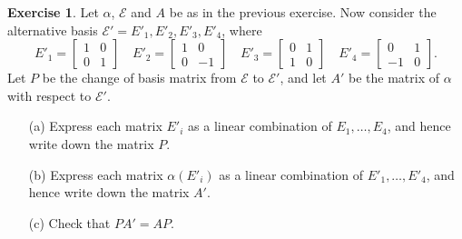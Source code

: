\documentclass{amsart}
\newcommand{\bsm}       {\left[\begin{smallmatrix}}
\newcommand{\esm}       {\end{smallmatrix}\right]}
\newcommand{\al}        {\alpha}
\newcommand{\CE}        {{\mathcal{E}}}
\renewcommand{\:}       {\colon}
\theoremstyle{definition}
\newtheorem{exercise}{Exercise}[section]
\begin{document}
\begin{exercise}
 Let $\al$, $\CE$ and $A$ be as in the previous exercise.
 Now consider the alternative basis
 $\CE'=E'_1,E'_2,E'_3,E'_4$, where 
 \[ E'_1 = \bsm 1&0\\0&1  \esm\hspace{1em}
    E'_2 = \bsm 1&0\\0&-1 \esm\hspace{1em}
    E'_3 = \bsm 0&1\\1&0  \esm\hspace{1em}
    E'_4 = \bsm 0&1\\-1&0 \esm.
 \] 
 Let $P$ be the change of basis matrix from $\CE$ to $\CE'$,
 and let $A'$ be the matrix of $\al$ with respect to $\CE'$.
 \begin{itemize}
  \item[(a)] Express each matrix $E'_i$ as a linear
   combination of $E_1,\dotsc,E_4$, and hence write down the
   matrix $P$.
  \item[(b)] Express each matrix $\al(E'_i)$ as a linear
   combination of $E'_1,\dotsc,E'_4$, and hence write down
   the matrix $A'$.
  \item[(c)] Check that $PA'=AP$.
 \end{itemize}
\end{exercise}
\end{document}
